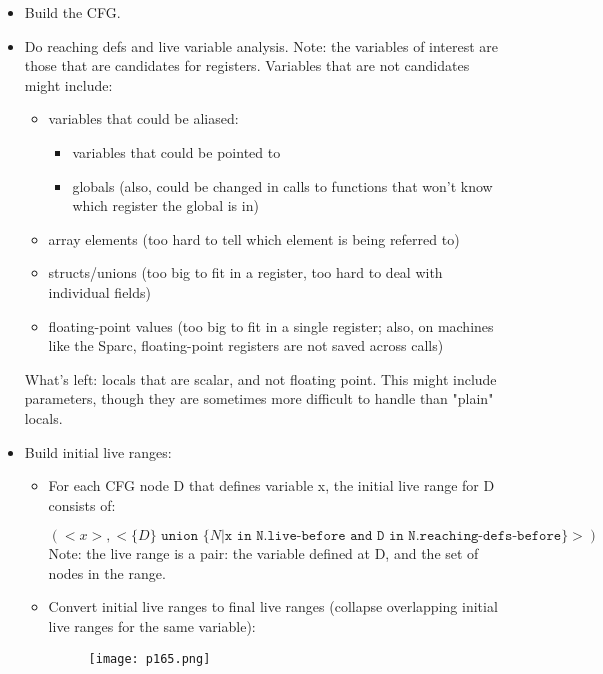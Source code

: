 \begin{itemize}
	\item Build the CFG.
	\item Do reaching defs and live variable analysis.
	      Note: the variables of interest are those that are candidates for registers. Variables that are not candidates might include:
	      \begin{itemize}
		      \item variables that could be aliased:
		            \begin{itemize}
			            \item variables that could be pointed to
			            \item globals (also, could be changed in calls to functions that won't know which register the global is in)
		            \end{itemize}
		      \item array elements (too hard to tell which element is being referred to)
		      \item structs/unions (too big to fit in a register, too hard to deal with individual fields)
		      \item floating-point values (too big to fit in a single register; also, on machines like the Sparc, floating-point registers are not saved across calls)
	      \end{itemize}
	      What's left: locals that are scalar, and not floating point. This might include parameters, though they are sometimes more difficult to handle than "plain" locals.
	\item 	Build initial live ranges:
	      \begin{itemize}
		      \item For each CFG node D that defines variable x, the initial live range for D consists of:

		            \(( <x>, <\{D\} \texttt{  union } \{N | \texttt{x in N.live-before and D in N.reaching-defs-before}\}> ) \)
		            Note: the live range is a pair: the variable defined at D, and the set of nodes in the range.
		      \item Convert initial live ranges to final live ranges (collapse overlapping initial live ranges for the same variable):

		            \begin{figure}[H]
			            \centering
			            \texttt{[image: p165.png]}
			            \caption{}
			            \label{fig:p165}
		            \end{figure}


	      \end{itemize}
\end{itemize}


